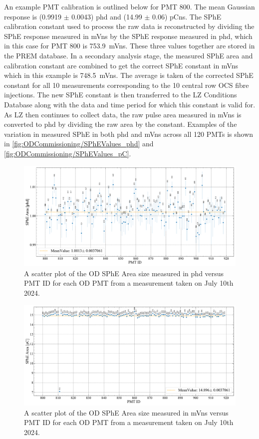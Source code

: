 An example PMT calibration is outlined below for PMT 800. The mean Gaussian response is (0.9919 $\pm$ 0.0043) phd and (14.99 $\pm$ 0.06) pCns. The SPhE calibration constant used to process the raw data is reconstructed by dividing the SPhE response measured in mVns by the SPhE response measured in phd, which in this case for PMT 800 is 753.9~mVns. These three values together are stored in the PREM database. In a secondary analysis stage, the measured SPhE area and calibration constant are combined to get the correct SPhE constant in mVns which in this example is 748.5~mVns. The average is taken of the corrected SPhE constant for all 10 measurements corresponding to the 10 central row OCS fibre injections. The new SPhE constant is then transferred to the LZ Conditions Database along with the data and time period for which this constant is valid for. As LZ then continues to collect data, the raw pulse area measured in mVns is converted to phd by dividing the raw area by the constant. Examples of the variation in measured SPhE in both phd and mVns across all 120 PMTs is shown in \autoref{fig:ODCommissioning/SPhEValues_phd} and \autoref{fig:ODCommissioning/SPhEValues_pC}.
\begin{figure}
    \centering
    \includegraphics[width=\textwidth]{figures/ODCommissioning/SPHE_phd_2024-7-10.pdf}
    \caption{A scatter plot of the OD SPhE Area size measured in phd versus PMT ID for each OD PMT from a measurement taken on July 10th 2024.}
    \label{fig:ODCommissioning/SPhEValues_phd}
\end{figure}
\begin{figure}
    \centering
    \includegraphics[width=\textwidth]{figures/ODCommissioning/SPHE_pC_2024-7-10.pdf}
    \caption{A scatter plot of the OD SPhE Area size measured in mVns versus PMT ID for each OD PMT from a measurement taken on July 10th 2024.}
    \label{fig:ODCommissioning/SPhEValues_pC}
\end{figure}
